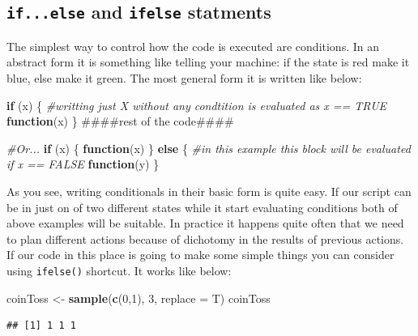 \documentclass[]{book}
\newenvironment{Shaded}{\begin{snugshade}}{\end{snugshade}}
\newcommand{\KeywordTok}[1]{\textcolor[rgb]{0.13,0.29,0.53}{\textbf{#1}}}
\newcommand{\DataTypeTok}[1]{\textcolor[rgb]{0.13,0.29,0.53}{#1}}
\newcommand{\DecValTok}[1]{\textcolor[rgb]{0.00,0.00,0.81}{#1}}
\newcommand{\StringTok}[1]{\textcolor[rgb]{0.31,0.60,0.02}{#1}}
\newcommand{\CommentTok}[1]{\textcolor[rgb]{0.56,0.35,0.01}{\textit{#1}}}
\newcommand{\ControlFlowTok}[1]{\textcolor[rgb]{0.13,0.29,0.53}{\textbf{#1}}}
\newcommand{\NormalTok}[1]{#1}
\theoremstyle{definition}
\theoremstyle{definition}
\theoremstyle{definition}
\theoremstyle{remark}
\begin{document}
\subsection{\texorpdfstring{\texttt{if...else} and \texttt{ifelse}
statments}{if...else and ifelse statments}}\label{if...else-and-ifelse-statments}

The simplest way to control how the code is executed are conditions. In
an abstract form it is something like telling your machine: if the state
is red make it blue, else make it green. The most general form it is
written like below:

\begin{Shaded}
\begin{Highlighting}[]
\ControlFlowTok{if}\NormalTok{ (x) \{ }\CommentTok{#writting just X without any condtition is evaluated as x == TRUE}
  \ControlFlowTok{function}\NormalTok{(x)}
\NormalTok{\}}
\NormalTok{####rest of the code####}

\CommentTok{#Or...}
\ControlFlowTok{if}\NormalTok{ (x) \{}
  \ControlFlowTok{function}\NormalTok{(x)}
\NormalTok{\} }\ControlFlowTok{else}\NormalTok{ \{ }\CommentTok{#in this example this block will be evaluated if x == FALSE}
  \ControlFlowTok{function}\NormalTok{(y)}
\NormalTok{\}}
\end{Highlighting}
\end{Shaded}

As you see, writing conditionals in their basic form is quite easy. If
our script can be in just on of two different states while it start
evaluating conditions both of above examples will be suitable. In
practice it happens quite often that we need to plan different actions
because of dichotomy in the results of previous actions. If our code in
this place is going to make some simple things you can consider using
\texttt{ifelse()} shortcut. It works like below:

\begin{Shaded}
\begin{Highlighting}[]
\NormalTok{coinToss <-}\StringTok{ }\KeywordTok{sample}\NormalTok{(}\KeywordTok{c}\NormalTok{(}\DecValTok{0}\NormalTok{,}\DecValTok{1}\NormalTok{), }\DecValTok{3}\NormalTok{, }\DataTypeTok{replace =}\NormalTok{ T)}
\NormalTok{coinToss}
\end{Highlighting}
\end{Shaded}

\begin{verbatim}
## [1] 1 1 1
\end{verbatim}
\end{document}
